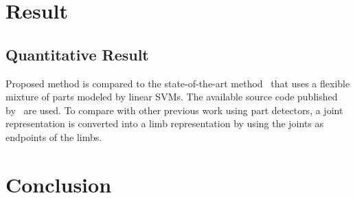 \documentclass[master,english,final]{postech-ucs}
\begin{document}

\chapter{Result}
\label{sec:result}
\section{Quantitative Result}

Proposed method is compared to the state-of-the-art method~\cite{FMP:2011} that uses a flexible mixture of parts modeled by linear SVMs. The available source code published by~\cite{FMP:2011} are used. To compare with other previous work using part detectors, a joint representation is converted into a limb representation by using the joints as endpoints of the limbs. 


\chapter{Conclusion}
\end{document}
